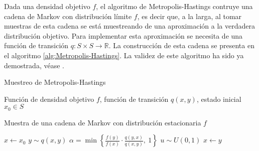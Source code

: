 Dada una densidad objetivo $f$, el algoritmo de Metropolis-Hastings contruye una 
cadena de Markov con distribución límite $f$, es decir que, a la larga, al tomar 
muestras de esta cadena se está muestreando de una aproximación a la verdadera
distribución objetivo. Para implementar esta aproximación se necesita de una 
función de transición $q:S\times S\to \mathbb R$. La construcción de esta 
cadena se presenta en el algoritmo \ref{alg:Metropolis-Hastings}. La validez de este 
algoritmo ha sido ya demostrada, véase \cite{rinconElementosSimulacionEstocastica2024}. 

\begin{algorithm}
\caption{Muestreo de Metropolis-Hastings}
\label{alg:Metropolis-Hastings}
\begin{algorithmic}[1]
\vspace{0.2cm}
\Require \parbox[t]{13cm}{
    Función de densidad objetivo $f$, función de transición $q(x,y)$,
    estado inicial $x_0\in S$
}
\vspace{0.2cm}
\Ensure 
\parbox[t]{13cm}{
    Muestra de una cadena de Markov con distribución estacionaria $f$
}
\vspace{0.2cm}
\State $x \leftarrow x_0$
    \State $y \sim q(x, y)$
    \State $\alpha = \min\left\{\frac{f(y)}{f(x)}\cdot \frac{q(y,x)}{q(x,y)},\ 1\right\}$
    \State $u \sim U(0,1)$
        \State $x \leftarrow y$
    \EndIf
\EndFor
\end{algorithmic}
\end{algorithm}




